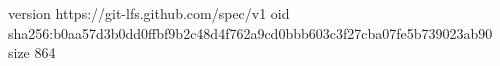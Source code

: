 version https://git-lfs.github.com/spec/v1
oid sha256:b0aa57d3b0dd0ffbf9b2c48d4f762a9cd0bbb603c3f27cba07fe5b739023ab90
size 864
